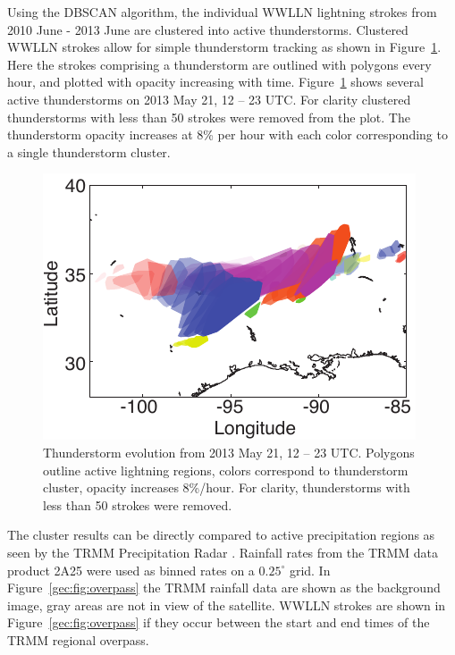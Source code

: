 Using the DBSCAN algorithm, the individual WWLLN lightning strokes from 2010 June - 2013 June are clustered into active thunderstorms.
Clustered WWLLN strokes allow for simple thunderstorm tracking as shown in Figure~\ref{gec:fig:evolution}.
Here the strokes comprising a thunderstorm are outlined with polygons every hour, and plotted with opacity increasing with time.
Figure~\ref{gec:fig:evolution} shows several active thunderstorms on 2013 May 21, 12 -- 23 UTC.
For clarity clustered thunderstorms with less than 50 strokes were removed from the plot.
The thunderstorm opacity increases at 8\% per hour with each color corresponding to a single thunderstorm cluster.

 \begin{figure}[ht!]
    \centering
    \includegraphics[scale=1]{GEC/Figures/evolution.pdf}
    \caption{Thunderstorm evolution from 2013 May 21, 12 -- 23 UTC.
    		 Polygons outline active lightning regions, colors correspond to thunderstorm cluster, opacity increases 8\%/hour.
		 For clarity, thunderstorms with less than 50 strokes were removed.}
    \label{gec:fig:evolution}
 \end{figure}

The cluster results can be directly compared to active precipitation regions as seen by the TRMM Precipitation Radar \citep{Kawanishi2000}.
Rainfall rates from the TRMM data product 2A25 were used as binned rates on a $0.25^\circ$ grid.
In Figure~\ref{gec:fig:overpass} the TRMM rainfall data are shown as the background image, gray areas are not in view of the satellite.
WWLLN strokes are shown in Figure~\ref{gec:fig:overpass} if they occur between the start and end times of the TRMM regional overpass.

